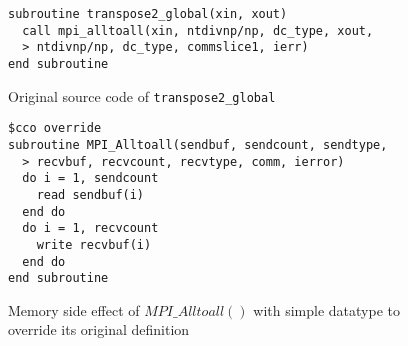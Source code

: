 \begin{figure}[h]
{\scriptsize
\begin{verbatim}
subroutine transpose2_global(xin, xout)
  call mpi_alltoall(xin, ntdivnp/np, dc_type, xout,
  > ntdivnp/np, dc_type, commslice1, ierr)
end subroutine
\end{verbatim}
}%
\caption{Original source code of \texttt{transpose2\_global}}
\label{fig:code:transpose2}
\end{figure}

%
%

\begin{figure}[h]
{\scriptsize
\begin{verbatim}
$cco override
subroutine MPI_Alltoall(sendbuf, sendcount, sendtype,
  > recvbuf, recvcount, recvtype, comm, ierror)
  do i = 1, sendcount
    read sendbuf(i)
  end do
  do i = 1, recvcount
    write recvbuf(i)
  end do
end subroutine
\end{verbatim}
}%
\caption{Memory side effect of $MPI\_Alltoall()$ with simple datatype to override its original definition}
\label{fig:annot:a2a}
\end{figure}



